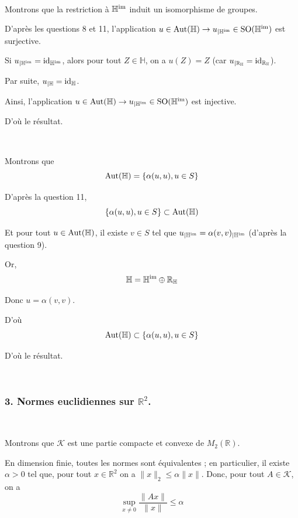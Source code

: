 \

 Montrons que la restriction {\`a} $\mathbb{H}^{\operatorname{im}}$
induit un isomorphisme de groupes.

D'apr{\`e}s les questions 8 et 11, l'application $u \in \operatorname{Aut}
(\mathbb{H}) \rightarrow u_{| \mathbb{H}^{\operatorname{im}} } \in \operatorname{SO}
(\mathbb{H}^{\operatorname{im}})$ est surjective.

Si $u_{| \mathbb{H}^{\operatorname{im}} } =
\operatorname{id}_{\mathbb{H}^{\operatorname{im}}}$, alors pour tout $Z \in \mathbb{H}$, on a
$u (Z) = Z$ (car $u_{| \mathbb{R}_{\mathbb{H}} } =
\operatorname{id}_{\mathbb{R}_{\mathbb{H}}}$).

Par suite, $u_{| \mathbb{H} } = \operatorname{id}_{\mathbb{H}}$.

Ainsi, l'application $u \in \operatorname{Aut} (\mathbb{H}) \rightarrow u_{|
\mathbb{H}^{\operatorname{im}} } \in \operatorname{SO} (\mathbb{H}^{\operatorname{im}})$ est
injective.

D'o{\`u} le r{\'e}sultat.

\

 Montrons que
\[ \operatorname{Aut} (\mathbb{H}) = \{ \alpha (u, u), u \in S \} \]


D'apr{\`e}s la question 11,
\[ \{ \alpha (u, u), u \in S \} \subset \operatorname{Aut} (\mathbb{H}) \]


Et pour tout $u \in \operatorname{Aut} (\mathbb{H})$, il existe $v \in S$ tel que
$u_{| \mathbb{H}^{\operatorname{im}} } = \alpha (v, v)_{|
\mathbb{H}^{\operatorname{im}} }$ (d'apr{\`e}s la question 9).

Or,
\[ \mathbb{H}=\mathbb{H}^{\operatorname{im}} \oplus \mathbb{R}_{\mathbb{H}} \]


Donc $u = \alpha (v, v)$.

D'o{\`u}
\[ \operatorname{Aut} (\mathbb{H}) \subset \{ \alpha (u, u), u \in S \} \]


D'o{\`u} le r{\'e}sultat.

\

\subsubsection*{3. Normes euclidiennes sur $\mathbb{R}^2$.}

\

 Montrons que $\mathcal{K}$ est une partie compacte et
convexe de $M_2 (\mathbb{R})$.

En dimension finie, toutes les normes sont {\'e}quivalentes ; en particulier,
il existe $\alpha > 0$ tel que, pour tout $x \in \mathbb{R}^2$ on a $\| x \|_2
\leqslant \alpha \| x \|$. Donc, pour tout $A \in \mathcal{K}$, on a
\[ \underset{x \neq 0}{\sup} \frac{\| A x \|}{\| x \|} \leqslant \alpha \]


